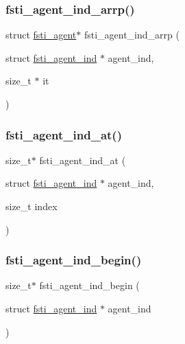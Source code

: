 \mbox{\label{fsti-agent_8c_a0d3fcfadb1159b63508be133b30f8df7}} 
\subsubsection{\texorpdfstring{fsti\+\_\+agent\+\_\+ind\+\_\+arrp()}{fsti\_agent\_ind\_arrp()}}
{\footnotesize\ttfamily struct \mbox{\hyperlink{structfsti__agent}{fsti\+\_\+agent}}$\ast$ fsti\+\_\+agent\+\_\+ind\+\_\+arrp (\begin{DoxyParamCaption}\item[{struct \mbox{\hyperlink{structfsti__agent__ind}{fsti\+\_\+agent\+\_\+ind}} $\ast$}]{agent\+\_\+ind,  }\item[{size\+\_\+t $\ast$}]{it }\end{DoxyParamCaption})}

\mbox{\label{fsti-agent_8c_a4c099994dc5a8cedc1de073fa64bfbcc}} 
\subsubsection{\texorpdfstring{fsti\+\_\+agent\+\_\+ind\+\_\+at()}{fsti\_agent\_ind\_at()}}
{\footnotesize\ttfamily size\+\_\+t$\ast$ fsti\+\_\+agent\+\_\+ind\+\_\+at (\begin{DoxyParamCaption}\item[{struct \mbox{\hyperlink{structfsti__agent__ind}{fsti\+\_\+agent\+\_\+ind}} $\ast$}]{agent\+\_\+ind,  }\item[{size\+\_\+t}]{index }\end{DoxyParamCaption})}

\mbox{\label{fsti-agent_8c_af8ec082c043d0719f2933f78c9b74879}} 
\subsubsection{\texorpdfstring{fsti\+\_\+agent\+\_\+ind\+\_\+begin()}{fsti\_agent\_ind\_begin()}}
{\footnotesize\ttfamily size\+\_\+t$\ast$ fsti\+\_\+agent\+\_\+ind\+\_\+begin (\begin{DoxyParamCaption}\item[{struct \mbox{\hyperlink{structfsti__agent__ind}{fsti\+\_\+agent\+\_\+ind}} $\ast$}]{agent\+\_\+ind }\end{DoxyParamCaption})}

